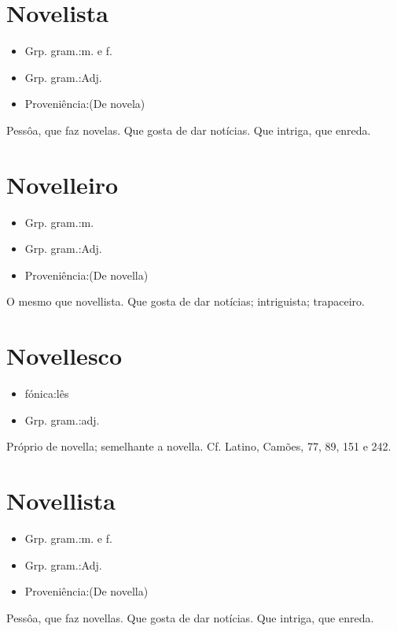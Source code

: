 \section{Novelista}
\begin{itemize}
\item {Grp. gram.:m.  e  f.}
\end{itemize}
\begin{itemize}
\item {Grp. gram.:Adj.}
\end{itemize}
\begin{itemize}
\item {Proveniência:(De \textunderscore novela\textunderscore )}
\end{itemize}
Pessôa, que faz novelas.
Que gosta de dar notícias.
Que intriga, que enreda.
\section{Novelleiro}
\begin{itemize}
\item {Grp. gram.:m.}
\end{itemize}
\begin{itemize}
\item {Grp. gram.:Adj.}
\end{itemize}
\begin{itemize}
\item {Proveniência:(De \textunderscore novella\textunderscore )}
\end{itemize}
O mesmo que \textunderscore novellista\textunderscore .
Que gosta de dar notícias; intriguista; trapaceiro.
\section{Novellesco}
\begin{itemize}
\item {fónica:lês}
\end{itemize}
\begin{itemize}
\item {Grp. gram.:adj.}
\end{itemize}
Próprio de novella; semelhante a novella. Cf. Latino, \textunderscore Camões\textunderscore , 77, 89, 151 e 242.
\section{Novellista}
\begin{itemize}
\item {Grp. gram.:m.  e  f.}
\end{itemize}
\begin{itemize}
\item {Grp. gram.:Adj.}
\end{itemize}
\begin{itemize}
\item {Proveniência:(De \textunderscore novella\textunderscore )}
\end{itemize}
Pessôa, que faz novellas.
Que gosta de dar notícias.
Que intriga, que enreda.
